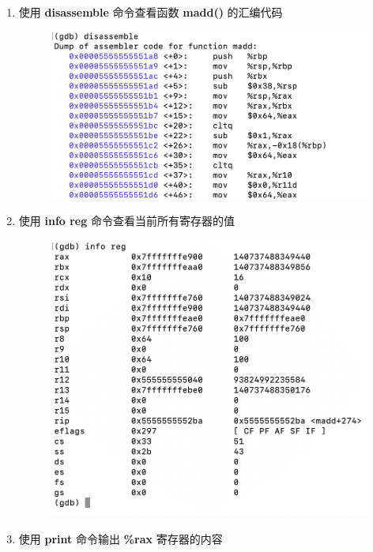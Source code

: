 \documentclass[UTF8, 12pt, a4paper, oneside]{ctexart}
\begin{document}
\begin{enumerate}
\begin{figure}[htbp]
                    \end{figure}
                \item 使用 \textbf{disassemble} 命令查看函数 \textbf{madd()} 的汇编代码
                    \begin{figure}[htbp]
                        \includegraphics*[width = 12cm]{2.11.png}                        
                    \end{figure}
                \newpage
                \item 使用 \textbf{info reg} 命令查看当前所有寄存器的值
                    \begin{figure}[htbp]
                        \includegraphics*[width = 12cm]{2.12.png}                        
                    \end{figure}
                \item 使用 \textbf{print} 命令输出 \textbf{\%rax} 寄存器的内容
                    \begin{figure}[htbp]

\end{figure}
\end{enumerate}
\end{document}
